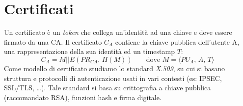 \documentclass[a4paper, 11pt, notitlepage, fleqn]{report}
\begin{document}
\section{Certificati}
Un certificato è un \emph{token} che collega un'identità ad una chiave e deve essere firmato da una CA. Il certificato $C_A$ contiene la chiave pubblica dell'utente A, una rappresentazione della sua identità ed un timestamp $T$:
\begin{equation*}
	C_A = M || E(PR_{CA},\,H(M))\qquad \mbox{dove } M=\langle PU_A,\,A,\,T\rangle
\end{equation*}
Come modello di certificato studiamo lo standard \emph{X.509}, su cui si basano struttura e protocolli di autenticazione usati in vari contesti (es: IPSEC, SSL/TLS, \dots). Tale standard si basa su crittografia a chiave pubblica (raccomandato RSA), funzioni hash e firma digitale.
\end{document}
